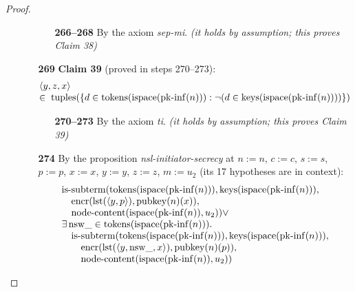 \documentclass[11pt]{article}
\theoremstyle{plain}
\begin{document}
\begin{proof}
\begin{itemize}[leftmargin=2.8em, itemsep=4pt, parsep=1pt]
\begin{itemize}[leftmargin=2.8em, itemsep=4pt, parsep=1pt]
  \begin{itemize}[leftmargin=2.8em, itemsep=4pt, parsep=1pt]
  \item[\textbf{266--268}] By the axiom \emph{sep-mi}.  \emph{(it holds by assumption; this proves Claim 38)}
  \end{itemize}
  \item[\textbf{269}] \textbf{Claim 39} (proved in steps 270--273):
\begin{equation*}
\begin{array}{@{}l@{}} \langle y, z, x \rangle \\ \in\; \operatorname{tuples}(\{d \in \operatorname{tokens}(\operatorname{ispace}(\operatorname{pk\text{-}inf}(n))) : \neg (d \in \operatorname{keys}(\operatorname{ispace}(\operatorname{pk\text{-}inf}(n))))\}) \end{array}
\end{equation*}

  \begin{itemize}[leftmargin=2.8em, itemsep=4pt, parsep=1pt]
  \item[\textbf{270--273}] By the axiom \emph{ti}.  \emph{(it holds by assumption; this proves Claim 39)}
  \end{itemize}
  \item[\textbf{274}] By the proposition \emph{nsl-initiator-secrecy} at $n := n$, $c := c$, $s := s$, $p := p$, $x := x$, $y := y$, $z := z$, $m := u_{2}$ (its 17 hypotheses are in context):
\begin{equation*}
\begin{array}{@{}l@{}} \operatorname{is\text{-}subterm}(\operatorname{tokens}(\operatorname{ispace}(\operatorname{pk\text{-}inf}(n))), \operatorname{keys}(\operatorname{ispace}(\operatorname{pk\text{-}inf}(n))), \\ \quad \operatorname{encr}(\operatorname{lst}(\langle y, p \rangle), \operatorname{pubkey}(n)(x)), \\ \quad \operatorname{node\text{-}content}(\operatorname{ispace}(\operatorname{pk\text{-}inf}(n)), u_{2})) \vee \\ \exists \operatorname{nsw\_} \in \operatorname{tokens}(\operatorname{ispace}(\operatorname{pk\text{-}inf}(n))). \\ \quad \operatorname{is\text{-}subterm}(\operatorname{tokens}(\operatorname{ispace}(\operatorname{pk\text{-}inf}(n))), \operatorname{keys}(\operatorname{ispace}(\operatorname{pk\text{-}inf}(n))), \\ \quad \quad \operatorname{encr}(\operatorname{lst}(\langle y, \operatorname{nsw\_}, x \rangle), \operatorname{pubkey}(n)(p)), \\ \quad \quad \operatorname{node\text{-}content}(\operatorname{ispace}(\operatorname{pk\text{-}inf}(n)), u_{2})) \end{array}
\end{equation*}


\end{itemize}
\end{itemize}
\end{proof}
\end{document}
